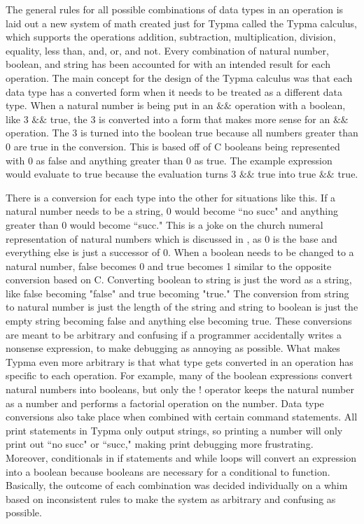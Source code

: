 \documentclass[10pt,twocolumn]{article}
\begin{document}
The general rules for all possible combinations of data types in an operation is laid out a new system of math created just for Typma called the Typma calculus, which supports the operations addition, subtraction, multiplication, division, equality, less than, and, or, and not. Every combination of natural number, boolean, and string has been accounted for with an intended result for each operation. The main concept for the design of the Typma calculus was that each data type has a converted form when it needs to be treated as a different data type. When a natural number is being put in an  $\&\&$ operation with a boolean, like 3 $\&\&$ true, the 3 is converted into a form that makes more sense for an $\&\&$ operation. The 3 is turned into the boolean true because all numbers greater than 0 are true in the conversion. This is based off of C booleans being represented with 0 as false and anything greater than 0 as true. The example expression would evaluate to true because the evaluation turns 3 $\&\&$ true into true $\&\&$ true.

There is a conversion for each type into the other for situations like this. If a natural number needs to be a string, 0 would become ``no succ" and anything greater than 0 would become ``succ." This is a joke on the church numeral representation of natural numbers which is discussed in \textcite{Pierce2021Software}, as 0 is the base and everything else is just a successor of 0. When a boolean needs to be changed to a natural number, false becomes 0 and true becomes 1 similar to the opposite conversion based on C. Converting boolean to string is just the word as a string, like false becoming "false" and true becoming "true." The conversion from string to natural number is just the length of the string and string to boolean is just the empty string becoming false and anything else becoming true. These conversions are meant to be arbitrary and confusing if a programmer accidentally writes a nonsense expression, to make debugging as annoying as possible. What makes Typma even more arbitrary is that what type gets converted in an operation has specific to each operation. For example, many of the boolean expressions convert natural numbers into booleans, but only the ! operator keeps the natural number as a number and performs a factorial operation on the number. Data type conversions also take place when combined with certain command statements. All print statements in Typma only output strings, so printing a number will only print out ``no succ" or ``succ," making print debugging more frustrating. Moreover, conditionals in if statements and while loops will convert an expression into a boolean because booleans are necessary for a conditional to function. Basically, the outcome of each combination was decided individually on a whim based on inconsistent rules to make the system as arbitrary and confusing as possible.
\end{document}
